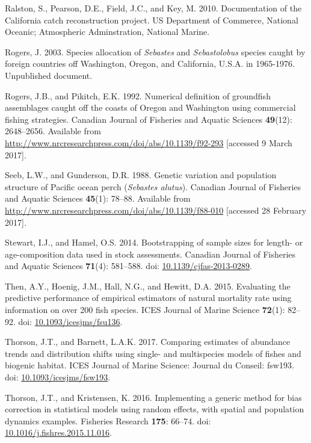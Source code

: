 \documentclass[12pt,]{article}
\begin{document}
\hypertarget{ref-ralston_documentation_2010}{}
Ralston, S., Pearson, D.E., Field, J.C., and Key, M. 2010. Documentation
of the California catch reconstruction project. US Department of
Commerce, National Oceanic; Atmospheric Adminstration, National Marine.

\hypertarget{ref-rogers_species_2003}{}
Rogers, J. 2003. Species allocation of \emph{Sebastes} and
\emph{Sebastolobus} species caught by foreign countries off Washington,
Oregon, and California, U.S.A. in 1965-1976. Unpublished document.

\hypertarget{ref-rogers_numerical_1992}{}
Rogers, J.B., and Pikitch, E.K. 1992. Numerical definition of groundfish
assemblages caught off the coasts of Oregon and Washington using
commercial fishing strategies. Canadian Journal of Fisheries and Aquatic
Sciences \textbf{49}(12): 2648--2656. Available from
\url{http://www.nrcresearchpress.com/doi/abs/10.1139/f92-293}
{[}accessed 9 March 2017{]}.

\hypertarget{ref-seeb_genetic_1988}{}
Seeb, L.W., and Gunderson, D.R. 1988. Genetic variation and population
structure of Pacific ocean perch (\emph{Sebastes alutus}). Canadian
Journal of Fisheries and Aquatic Sciences \textbf{45}(1): 78--88.
Available from
\url{http://www.nrcresearchpress.com/doi/abs/10.1139/f88-010}
{[}accessed 28 February 2017{]}.

\hypertarget{ref-stewart_bootstrapping_2014}{}
Stewart, I.J., and Hamel, O.S. 2014. Bootstrapping of sample sizes for
length- or age-composition data used in stock assessments. Canadian
Journal of Fisheries and Aquatic Sciences \textbf{71}(4): 581--588. doi:
\href{https://doi.org/10.1139/cjfas-2013-0289}{10.1139/cjfas-2013-0289}.

\hypertarget{ref-then_evaluating_2015}{}
Then, A.Y., Hoenig, J.M., Hall, N.G., and Hewitt, D.A. 2015. Evaluating
the predictive performance of empirical estimators of natural mortality
rate using information on over 200 fish species. ICES Journal of Marine
Science \textbf{72}(1): 82--92. doi:
\href{https://doi.org/10.1093/icesjms/fsu136}{10.1093/icesjms/fsu136}.

\hypertarget{ref-thorson_comparing_2017}{}
Thorson, J.T., and Barnett, L.A.K. 2017. Comparing estimates of
abundance trends and distribution shifts using single- and multispecies
models of fishes and biogenic habitat. ICES Journal of Marine Science:
Journal du Conseil: fsw193. doi:
\href{https://doi.org/10.1093/icesjms/fsw193}{10.1093/icesjms/fsw193}.

\hypertarget{ref-thorson_implementing_2016}{}
Thorson, J.T., and Kristensen, K. 2016. Implementing a generic method
for bias correction in statistical models using random effects, with
spatial and population dynamics examples. Fisheries Research
\textbf{175}: 66--74. doi:
\href{https://doi.org/10.1016/j.fishres.2015.11.016}{10.1016/j.fishres.2015.11.016}.
\end{document}
